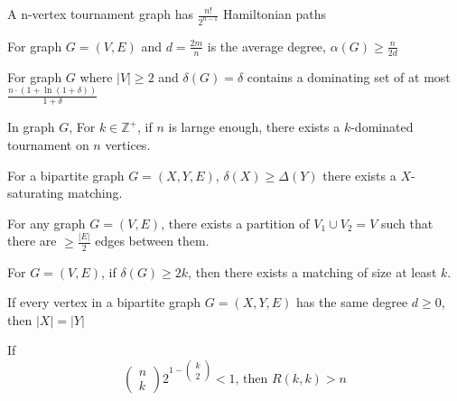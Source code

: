 \begin{theorem}
	A n-vertex tournament graph has $\frac{n!}{2^{n-1}}$ Hamiltonian paths
\end{theorem}

\begin{theorem}
	For graph $G=(V,E)$ and $d=\frac{2m}{n}$ is the average degree, $\alpha(G) \geq \frac{n}{2d}$
\end{theorem}

\begin{theorem}
	For graph $G$ where $|V|\geq 2$ and $\delta(G)=\delta$ contains a dominating set of at most $\frac{n\cdot (1+\ln(1+\delta))}{1+\delta}$
\end{theorem}

\begin{theorem}
	In graph $G$, For $k\in \mathbb{Z}^+$, if $n$ is larnge enough, there exists a $k$-dominated tournament on $n$ vertices.
\end{theorem}

\begin{theorem}
	For a bipartite graph $G=(X,Y,E)$, $\delta(X)\geq \Delta(Y)$ there exists a $X$-saturating matching.
\end{theorem}

\begin{theorem}
	For any graph $G=(V,E)$, there exists a partition of $V_1\cup V_2=V$ such that there are $\geq \frac{|E|}{2}$ edges between them.
\end{theorem}

\begin{theorem}
	For $G=(V,E)$, if $\delta(G)\geq 2k$, then there exists a matching of size at least $k$.
\end{theorem}

\begin{theorem}
	If every vertex in a bipartite graph $G=(X,Y,E)$ has the same degree $d\geq 0$, then $|X|=|Y|$
\end{theorem}


\begin{theorem}
	If
	$$
\left(\begin{array}{l}
n \\
k
\end{array}\right) 2^{1-\left(\begin{array}{c}
k \\
2
\end{array}\right)}<1 \text {, then } R(k, k)>n
$$
\end{theorem}

